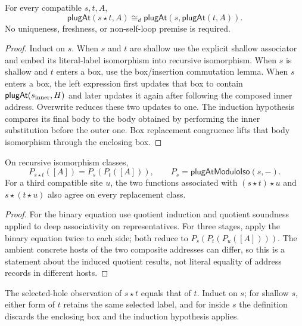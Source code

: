 \begin{theorem}
For every compatible $s,t,A$,
\[
 \mathsf{plugAt}(s\star t,A)\cong_d
 \mathsf{plugAt}(s,\mathsf{plugAt}(t,A)).
\]
No uniqueness, freshness, or non-self-loop premise is required.
\end{theorem}
\begin{proof}
Induct on $s$. When $s$ and $t$ are shallow use the explicit shallow associator
and embed its literal-label isomorphism into recursive isomorphism. When $s$
is shallow and $t$ enters a box, use the box/insertion commutation lemma.
When $s$ enters a box, the left expression first updates that box to contain
$\mathsf{plugAt}(s_{\rm inner},H)$ and later updates it again after following
the composed inner address. Overwrite reduces these two updates to one. The
induction hypothesis compares its final body to the body obtained by performing
the inner substitution before the outer one. Box replacement congruence lifts
that body isomorphism through the enclosing box.
\end{proof}

\begin{lemma}
On recursive isomorphism classes,
\[
 P_{s\star t}([A])=P_s(P_t([A])),\qquad
 P_s=\mathsf{plugAtModuloIso}(s,-).
\]
For a third compatible site $u$, the two functions associated with
$(s\star t)\star u$ and $s\star(t\star u)$ also agree on every replacement class.
\end{lemma}
\begin{proof}
For the binary equation use quotient induction and quotient soundness applied
to deep associativity on representatives. For three stages, apply the binary
equation twice to each side; both reduce to $P_s(P_t(P_u([A])))$.
The ambient concrete hosts of the two composite addresses can differ, so this
is a statement about the induced quotient results, not literal equality of
address records in different hosts.
\end{proof}

The selected-hole observation of $s\star t$ equals that of $t$. Induct on $s$;
for shallow $s$, either form of $t$ retains the same selected label, and for
inside $s$ the definition discards the enclosing box and the induction hypothesis
applies.

